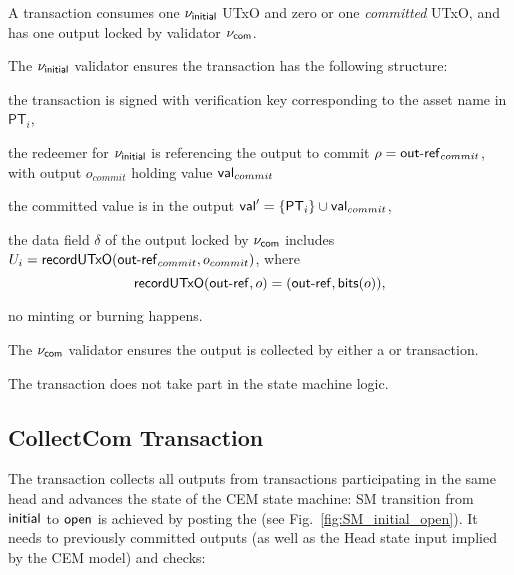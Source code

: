A \mtxCom{} transaction consumes one $\nu_\mathsf{initial}$ UTxO and zero or one \emph{committed} UTxO, and has one output locked by validator $\nu_\mathsf{com}$. 

The $\nu_\mathsf{initial}$ validator ensures the transaction has the following structure:
\begin{menumerate}
    \item the transaction is signed with verification key corresponding to the asset name in $\mathsf{PT}_i$,
    \item the redeemer for $\nu_\mathsf{initial}$ is referencing the output to commit $ \rho = \mathsf{out\textsf{-}{}ref}_{commit}$, with output $o_{commit}$ holding value $\mathsf{val}_{commit}$
    \item the committed value is in the output $\mathsf{val}' = \{\mathsf{PT}_{i}\} \cup \mathsf{val}_{commit} $,
    \item the data field $\delta$ of the output locked by $\nu_\mathsf{com}$ includes 
    $U_i = \mathsf{recordUTxO}(\mathsf{out\textsf{-}{}ref}_{commit},o_{commit})$, where 
    $$\mathsf{recordUTxO} (\mathsf{out\textsf{-}{}ref}, o) = (\mathsf{out\textsf{-}{}ref}, \mathsf{bits}(o)),
    $$
    \item no minting or burning happens.
\end{menumerate}

The $\nu_\mathsf{com}$ validator ensures the output is collected by either a \mtxCCom{} or \mtxAbort{} transaction.
\begin{boxM}
The \mtxCom{} transaction does not take part in the state machine logic.
\end{boxM}


\subsection{CollectCom Transaction} 



The \mtxCCom{} transaction collects all outputs from \mtxCom{} transactions participating in the same head and advances the state of the CEM state machine:
SM transition from $\mathsf{initial}$ to
$\mathsf{open}$ is achieved by posting the (see
Fig.~\ref{fig:SM_initial_open}). It needs to previously committed
outputs (as well as the Head state input implied by the CEM model) and checks:


